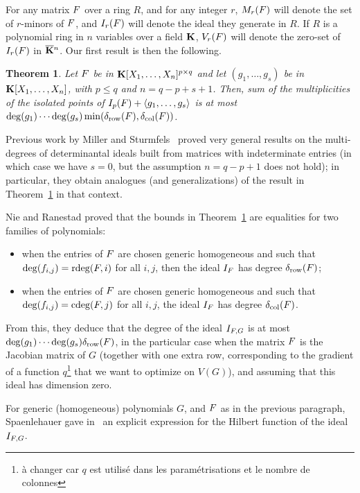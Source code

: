 \documentclass[12pt]{article}
\newtheorem{theorem}[definition]{Theorem}
\begin{document}
For any matrix ${F}$ over a ring $R$, and for any integer $r$,
$M_r({F})$ will denote the set of $r$-minors of ${F}$, and $I_r({F})$
will denote the ideal they generate in $R$. If $R$ is a polynomial
ring in $n$ variables over a field $\mathbf{K}$, $V_r({F})$ will denote the
zero-set of $I_r({F})$ in $\overline{\mathbf{K}}{}^n$. Our first result is then the
following.
\begin{theorem}\label{theo:1}
  Let ${F}$ be in $\mathbf{K}[X_1,\dots,X_n]^{p \times q}$ and let
  $(g_1,\dots,g_s)$ be in $\mathbf{K}[X_1,\dots,X_n]$, with $p \le q$ and
  $n=q-p+s+1$. Then, sum of the multiplicities of the isolated points
  of $I_p({F}) + \langle g_1,\dots,g_s \rangle$ is at most $\deg(g_1)
  \cdots \deg(g_s) \min(\delta_{\rm row}({F}), \delta_{\rm
    col}({F}))$.
\end{theorem}
Previous work by Miller and Sturmfels~\cite[Chapter~15]{MiSt04} proved
very general results on the multi-degrees of determinantal ideals
built from matrices with indeterminate entries (in which case we have
$s=0$, but the assumption $n=q-p+1$ does not hold); in particular,
they obtain analogues (and generalizations) of the result in
Theorem~\ref{theo:1} in that context.

Nie and Ranestad proved that the bounds in Theorem~\ref{theo:1} are
equalities for two families of polynomials:
\begin{itemize}
\item when the entries of ${F}$ are chosen generic homogeneous and
  such that $\deg(f_{i,j}) = \mathrm{rdeg}({F},i)$ for all $i,j$, then the
  ideal $I_{{F}}$ has degree $\delta_{\rm row}({F})$;
\item when the entries of ${F}$ are chosen generic homogeneous and
  such that $\deg(f_{i,j}) = \mathrm{cdeg}({F},j)$ for all $i,j$, the ideal
  $I_{{F}}$ has degree $\delta_{\rm col}({F})$.
\end{itemize}
From this, they deduce that the degree of the ideal $I_{{F},G}$ is at
most $\deg(g_1) \cdots \deg(g_s) \delta_{\rm row}({F})$, in the
particular case when the matrix ${F}$ is the Jacobian matrix of $G$
(together with one extra row, corresponding to the gradient of a
function $q$\footnote{\`a changer car $q$ est utilis\'e dans les
  param\'etrisations et le nombre de colonnes} that we want to
optimize on $V(G)$), and assuming that this ideal has dimension zero.

For generic (homogeneous) polynomials $G$, and ${F}$ as in the
previous paragraph, Spaenlehauer gave in~\cite{Spa14} an explicit
expression for the Hilbert function of the ideal $I_{{F},G}$.
\end{document}
